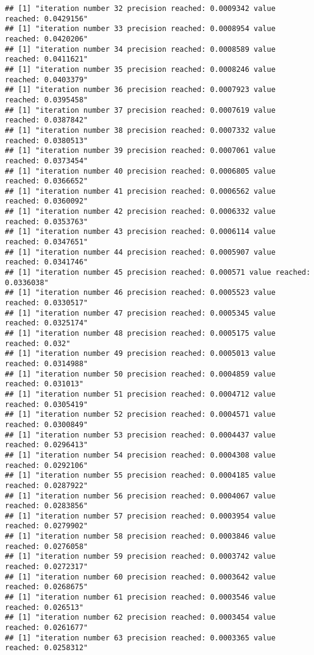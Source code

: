 \documentclass[
]{article}
\begin{document}
\begin{verbatim}
## [1] "iteration number 32 precision reached: 0.0009342 value reached: 0.0429156"
## [1] "iteration number 33 precision reached: 0.0008954 value reached: 0.0420206"
## [1] "iteration number 34 precision reached: 0.0008589 value reached: 0.0411621"
## [1] "iteration number 35 precision reached: 0.0008246 value reached: 0.0403379"
## [1] "iteration number 36 precision reached: 0.0007923 value reached: 0.0395458"
## [1] "iteration number 37 precision reached: 0.0007619 value reached: 0.0387842"
## [1] "iteration number 38 precision reached: 0.0007332 value reached: 0.0380513"
## [1] "iteration number 39 precision reached: 0.0007061 value reached: 0.0373454"
## [1] "iteration number 40 precision reached: 0.0006805 value reached: 0.0366652"
## [1] "iteration number 41 precision reached: 0.0006562 value reached: 0.0360092"
## [1] "iteration number 42 precision reached: 0.0006332 value reached: 0.0353763"
## [1] "iteration number 43 precision reached: 0.0006114 value reached: 0.0347651"
## [1] "iteration number 44 precision reached: 0.0005907 value reached: 0.0341746"
## [1] "iteration number 45 precision reached: 0.000571 value reached: 0.0336038"
## [1] "iteration number 46 precision reached: 0.0005523 value reached: 0.0330517"
## [1] "iteration number 47 precision reached: 0.0005345 value reached: 0.0325174"
## [1] "iteration number 48 precision reached: 0.0005175 value reached: 0.032"
## [1] "iteration number 49 precision reached: 0.0005013 value reached: 0.0314988"
## [1] "iteration number 50 precision reached: 0.0004859 value reached: 0.031013"
## [1] "iteration number 51 precision reached: 0.0004712 value reached: 0.0305419"
## [1] "iteration number 52 precision reached: 0.0004571 value reached: 0.0300849"
## [1] "iteration number 53 precision reached: 0.0004437 value reached: 0.0296413"
## [1] "iteration number 54 precision reached: 0.0004308 value reached: 0.0292106"
## [1] "iteration number 55 precision reached: 0.0004185 value reached: 0.0287922"
## [1] "iteration number 56 precision reached: 0.0004067 value reached: 0.0283856"
## [1] "iteration number 57 precision reached: 0.0003954 value reached: 0.0279902"
## [1] "iteration number 58 precision reached: 0.0003846 value reached: 0.0276058"
## [1] "iteration number 59 precision reached: 0.0003742 value reached: 0.0272317"
## [1] "iteration number 60 precision reached: 0.0003642 value reached: 0.0268675"
## [1] "iteration number 61 precision reached: 0.0003546 value reached: 0.026513"
## [1] "iteration number 62 precision reached: 0.0003454 value reached: 0.0261677"
## [1] "iteration number 63 precision reached: 0.0003365 value reached: 0.0258312"

\end{verbatim}
\end{document}

